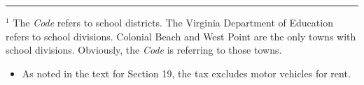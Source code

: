\documentclass[
]{book}
\providecommand{\tightlist}{%
  \setlength{\itemsep}{0pt}\setlength{\parskip}{0pt}}
\begin{document}
\begin{center}\rule{0.5\linewidth}{0.5pt}\end{center}

\(^1\) The \emph{Code} refers to school districts. The Virginia Department of Education refers to school divisions. Colonial Beach and West Point are the only towns with school divisions. Obviously, the \emph{Code} is referring to those towns.

\begin{itemize}
\tightlist
\item
  As noted in the text for Section 19, the tax excludes motor vehicles for rent.
\end{itemize}

  
\end{document}
